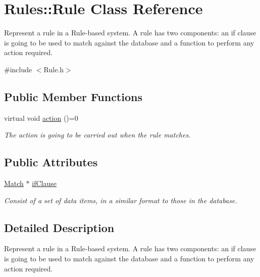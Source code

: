 \hypertarget{classRules_1_1Rule}{}\section{Rules\+:\+:Rule Class Reference}
\label{classRules_1_1Rule}


Represent a rule in a Rule-\/based system. A rule has two components\+: an if clause is going to be used to match against the database and a function to perform any action required.  




{\ttfamily \#include $<$Rule.\+h$>$}

\subsection*{Public Member Functions}
\begin{DoxyCompactItemize}
\item 
virtual void \hyperlink{classRules_1_1Rule_a6fe9b4fa6aaface7ba7f2400d2b27dbc}{action} ()=0
\begin{DoxyCompactList}\small\item\em The action is going to be carried out when the rule matches. \end{DoxyCompactList}\end{DoxyCompactItemize}
\subsection*{Public Attributes}
\begin{DoxyCompactItemize}
\item 
\hyperlink{structRules_1_1Match}{Match} $\ast$ \hyperlink{classRules_1_1Rule_a4b4030afd5ca2d4812ba9100b3b0047d}{if\+Clause}\hypertarget{classRules_1_1Rule_a4b4030afd5ca2d4812ba9100b3b0047d}{}\label{classRules_1_1Rule_a4b4030afd5ca2d4812ba9100b3b0047d}

\begin{DoxyCompactList}\small\item\em Consist of a set of data items, in a similar format to those in the database. \end{DoxyCompactList}\end{DoxyCompactItemize}


\subsection{Detailed Description}
Represent a rule in a Rule-\/based system. A rule has two components\+: an if clause is going to be used to match against the database and a function to perform any action required. 

